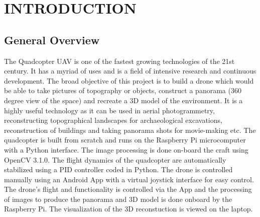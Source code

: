 
\chapter{INTRODUCTION} %
\section{General Overview} %
The Quadcopter UAV is one of the fastest growing technologies of the 21st century. It has a myriad of uses and is a field of intensive research and continuous development. The broad objective of this project is to build a drone which would be able to take pictures of topography or objects, construct a panorama (360 degree view of the space) and recreate a 3D model of the environment. It is a highly useful technology as it can be used in aerial photogrammetry, reconstructing topographical landscapes for archaeological excavations, reconstruction of buildings and taking panorama shots for movie-making etc.
The quadcopter is built from scratch and runs on the Raspberry Pi microcomputer with a Python interface. The image processing is done on-board the craft using OpenCV 3.1.0. The flight dynamics of the quadcopter are automatically stabilized using a PID controller coded in Python. The drone is controlled manually using an Android App with a virtual joystick interface for easy control.
The drone's flight and functionality is controlled via the App and the processing of images to produce the panorama and 3D model is done onboard by the Raspberry Pi. The visualization of the 3D reconstuction is viewed on the laptop.
